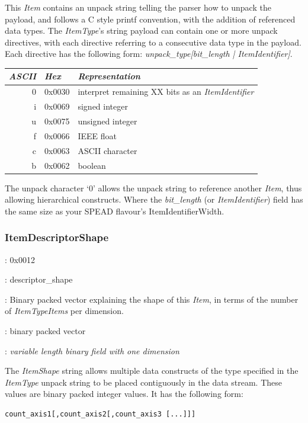 \documentclass[11pt,english,twoside]{article}
\begin{document}
This \emph{Item} contains an unpack string telling the parser how to unpack the payload, and follows a C style printf convention, with the
addition of referenced data types. The \emph{ItemType}'s string payload can contain one or more unpack directives, with each directive referring
to a consecutive data type in the payload. Each directive has the following form: \emph{unpack\_type[bit\_length | ItemIdentifier]}.

\begin{tabular}{|r|l|l|}
\hline
\emph{ASCII} & \emph{Hex} & \emph{Representation} \\
\hline
0 & 0x0030 & interpret remaining XX bits as an \emph{ItemIdentifier} \\
i & 0x0069 & signed integer \\
u & 0x0075 & unsigned integer \\
f & 0x0066 & IEEE float \\
c & 0x0063 & ASCII character \\
b & 0x0062 & boolean \\
\hline
\end{tabular}

The unpack character `0' allows the unpack string to reference another \emph{Item}, thus allowing hierarchical constructs. Where the
\emph{bit\_length} (or \emph{ItemIdentifier}) field has the same size as your SPEAD flavour's ItemIdentifierWidth.


\subsubsection{ItemDescriptorShape}

\begin{description}
\setlength{\itemindent}{0.5cm}
\setlength{\itemsep}{0ex plus0.2ex}
\item[Numerical Identifier]: 0x0012
\item[Name]: descriptor\_shape
\item[Description]: Binary packed vector explaining the shape of this \emph{Item}, in terms of the number of \emph{ItemTypeItems} per
dimension.
\item[Type]: binary packed vector
\item[Shape]: \emph{variable length binary field with one dimension}
\end{description}

The \emph{ItemShape} string allows multiple data constructs of the type specified in the \emph{ItemType} unpack string to be placed contiguously
in the data stream. These values are binary packed integer values. It has the following form:
\begin{verbatim}
count_axis1[,count_axis2[,count_axis3 [...]]]
\end{verbatim}
\end{document}
